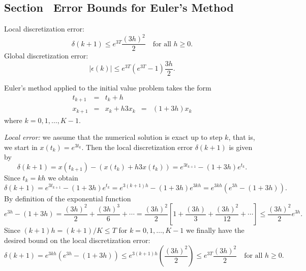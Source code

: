 \documentclass{ximera}
\begin{document}
\subsection*{Section~\protect{\ref{sec:EEEM}} Error Bounds for Euler's Method}

 \ans Local discretization error:
\[
\delta(k+1) \le
e^{3T}\frac{(3h)^2}{2} \quad \mbox{for all $h\ge 0$.}
\]
Global discretization error:
\[
|\epsilon(k)| \le e^{3T}(e^{3T}-1)\frac{3h}{2}.
\]

\soln Euler's method applied to the initial value problem takes the form
\[
\begin{array}{rclcl}
t_{k+1} & = & t_k+h & & \\
x_{k+1} & = & x_k + h 3 x_k & = & (1+3h)x_k
\end{array}
\]
where $k=0,1,\ldots,K-1$.

{\em Local error:} we assume that the
numerical solution is exact up to step $k$, that is,
we start in $x(t_k)=e^{3t_k}$.  Then the local discretization error
$\delta(k+1)$ is given by
\[
\delta(k+1) = x(t_{k+1}) - (x(t_k) + h 3x(t_k))=
e^{3t_{k+1}} - (1+3h)e^{t_k}.
\]
Since $t_k = kh$ we obtain
\[
\delta(k+1) = e^{3t_{k+1}} - (1+3h)e^{t_k} =
e^{3(k+1)h} - (1+3h)e^{3kh} = e^{3kh}(e^{3h}-(1+3h)).
\]
By definition of the exponential function
\[
e^{3h}-(1+3h) = \frac{(3h)^2}{2}+\frac{(3h)^3}{6}+\cdots =
\frac{(3h)^2}{2}\left[ 1+\frac{(3h)}{3}+\frac{(3h)^2}{12}+\cdots\right]
\le \frac{(3h)^2}{2}e^{3h}.
\]
Since $(k+1)h=(k+1)/K\le T$ for $k=0,1,\ldots,K-1$ we finally have the
desired bound on the local discretization error:
\[
\delta(k+1) = e^{3kh}(e^{3h}-(1+3h)) \le
e^{3(k+1)h}\left(\frac{(3h)^2}{2}\right)\le
e^{3T}\frac{(3h)^2}{2} \quad \mbox{for all $h\ge 0$.}
\]
\end{document}
